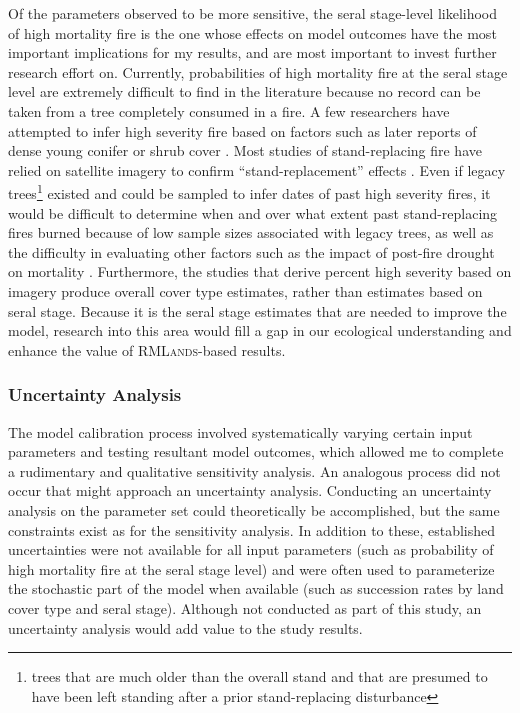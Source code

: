 Of the parameters observed to be more sensitive, the seral stage-level likelihood of high mortality fire is the one whose effects on model outcomes have the most important implications for my results, and are most important to invest further research effort on. Currently, probabilities of high mortality fire at the seral stage level are extremely difficult to find in the literature because no record can be taken from a tree completely consumed in a fire. A few researchers have attempted to infer high severity fire based on factors such as later reports of dense young conifer or shrub cover \citep{Collins2011,Baker2014,Stephens2015}. Most studies of stand-replacing fire have relied on satellite imagery to confirm ``stand-replacement'' effects \citep[e.g.,][]{Collins2010,Mallek2013}. Even if legacy trees\footnote{trees that are much older than the overall stand and that are presumed to have been left standing after a prior stand-replacing disturbance} existed and could be sampled to infer dates of past high severity fires, it would be difficult to determine when and over what extent past stand-replacing fires burned because of low sample sizes associated with legacy trees, as well as the difficulty in evaluating other factors such as the impact of post-fire drought on mortality \citep{Minnich2000,Baker2014}. Furthermore, the studies that derive percent high severity based on imagery produce overall cover type estimates, rather than estimates based on seral stage. Because it is the seral stage estimates that are needed to improve the model, research into this area would fill a gap in our ecological understanding and enhance the value of \textsc{RMLands}-based results.

\subsubsection*{Uncertainty Analysis} The model calibration process involved systematically varying certain input parameters and testing resultant model outcomes, which allowed me to complete a rudimentary and qualitative sensitivity analysis. An analogous process did not occur that might approach an uncertainty analysis. Conducting an uncertainty analysis on the parameter set could theoretically be accomplished, but the same constraints exist as for the sensitivity analysis. In addition to these, established uncertainties were not available for all input parameters (such as probability of high mortality fire at the seral stage level) and were often used to parameterize the stochastic part of the model when available (such as succession rates by land cover type and seral stage). Although not conducted as part of this study, an uncertainty analysis would add value to the study results.

